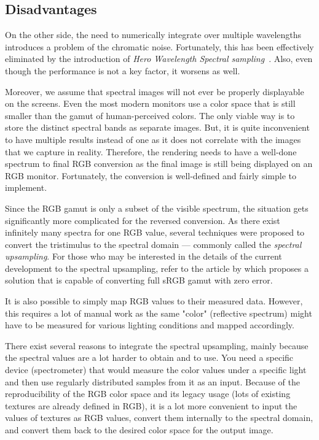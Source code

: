 \subsection{Disadvantages}

On the other side, the need to numerically integrate over multiple wavelengths introduces a problem of the chromatic noise. Fortunately, this has been effectively eliminated by the introduction of \emph{Hero Wavelength Spectral sampling}~\cite{wilkie2014hero}. Also, even though the performance is not a key factor, it worsens as well. 

Moreover, we assume that spectral images will not ever be properly displayable on the screens. Even the most modern monitors use a color space that is still smaller than the gamut of human-perceived colors. The only viable way is to store the distinct spectral bands as separate images. But, it is quite inconvenient to have multiple results instead of one as it does not correlate with the images that we capture in reality. Therefore, the rendering needs to have a well-done spectrum to final RGB conversion as the final image is still being displayed on an RGB monitor. Fortunately, the conversion is well-defined and fairly simple to implement.

Since the RGB gamut is only a subset of the visible spectrum, the situation gets significantly more complicated for the reversed conversion. As there exist infinitely many spectra for one RGB value, several techniques were proposed to convert the tristimulus to the spectral domain --- commonly called the \emph{spectral upsampling}. For those who may be interested in the details of the current development to the spectral upsampling, refer to the article by \citet{jakob2019low} which proposes a solution that is capable of converting full sRGB gamut with zero error.

It is also possible to simply map RGB values to their measured data. However, this requires a lot of manual work as the same "color" (reflective spectrum) might have to be measured for various lighting conditions and mapped accordingly.

There exist several reasons to integrate the spectral upsampling, mainly because the spectral values are a lot harder to obtain and to use. You need a specific device (spectrometer) that would measure the color values under a specific light and then use regularly distributed samples from it as an input. Because of the reproducibility of the RGB color space and its legacy usage (lots of existing textures are already defined in RGB), it is a lot more convenient to input the values of textures as RGB values, convert them internally to the spectral domain, and convert them back to the desired color space for the output image.
